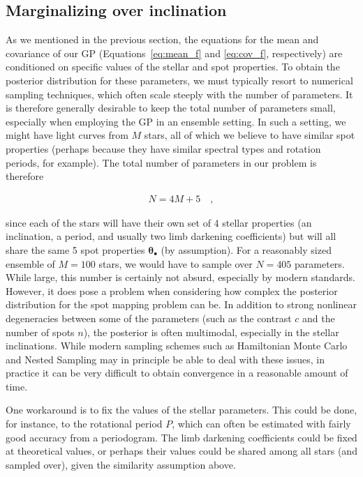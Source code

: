 \documentclass[modern,linenumbers]{aastex62}
\begin{document}
\subsection{Marginalizing over inclination}
\label{sec:gp-inc}
%
As we mentioned in the previous section,
the equations for the mean and covariance of our GP
(Equations~\ref{eq:mean_f} and \ref{eq:cov_f}, respectively) are conditioned
on specific values of the stellar and spot properties. To obtain the posterior distribution
for these parameters, we must typically resort to numerical sampling techniques,
which often scale steeply with the number of parameters. It is therefore generally
desirable to keep the total number of parameters small, especially when
employing the GP in an ensemble setting.
In such a setting, we might have light curves from $M$ stars, all of which
we believe to have similar spot properties (perhaps because they have
similar spectral types and rotation periods, for example).
The total number of parameters in our problem is therefore
%
\begin{linenomath}\begin{align}
        N = 4 M + 5
        \quad,
    \end{align}\end{linenomath}
%
since each of the stars will have their own set of 4 stellar properties
(an inclination, a period, and usually two limb darkening coefficients)
but will all share the same 5 spot properties
$\pmb{\theta}_\bullet$ (by assumption).
For a reasonably sized ensemble of $M=100$
stars, we would have to sample over $N = 405$ parameters.
While large, this number is certainly not absurd, especially by modern standards.
However, it does pose
a problem when considering how complex the posterior distribution for the
spot mapping problem can be. In addition to strong nonlinear degeneracies
between some of the parameters (such as the contrast $c$ and the
number of spots $n$), the posterior is often multimodal, especially in the
stellar inclinations. While modern sampling schemes such as Hamiltonian
Monte Carlo and Nested Sampling may in principle be able to deal with these
issues, in practice it can be very difficult to obtain convergence in a
reasonable amount of time.

One workaround is to fix the values of the stellar parameters. This could be done,
for instance, to the rotational period $P$, which can often be estimated with
fairly good accuracy from a periodogram. The limb darkening coefficients could
be fixed at theoretical values, or perhaps their values could be shared among
all stars (and sampled over), given the similarity assumption above.
\end{document}
